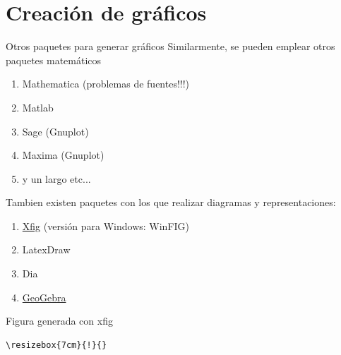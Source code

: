 \documentclass{beamer}
\begin{document}
\section{Creaci\'on de gr\'aficos}
\begin{frame}{Otros paquetes para generar gr\'aficos}
Similarmente, se pueden emplear otros paquetes matem\'aticos 
\begin{enumerate}
\item Mathematica {\small (problemas de fuentes!!!)}
\item Matlab
\item Sage  (Gnuplot)
\item Maxima (Gnuplot)
\item y un largo etc...
\end{enumerate}
Tambien existen paquetes con los que realizar diagramas y representaciones:
\begin{enumerate}
\item \href{http://www.xfig.org}{Xfig} {\small (versi\'on para Windows: WinFIG)}
\item LatexDraw
\item Dia
\item \href{http://www.geogebra.org/cms/}{GeoGebra}
\end{enumerate}
\end{frame}
\begin{frame}[fragile]{Figura generada con xfig}
\begin{verbatim}
\resizebox{7cm}{!}{}
\end{verbatim}
\resizebox{7cm}{!}{}
\end{frame}
\end{document}
